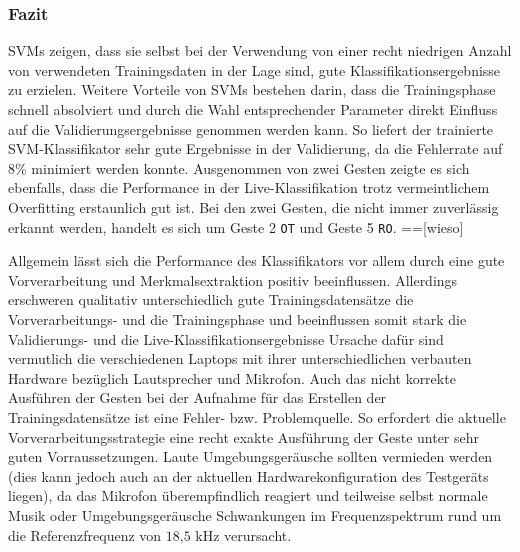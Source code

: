 \subsubsection{Fazit}\label{sec:svm_conclusion}
\ac{SVM}s zeigen, dass sie selbst bei der Verwendung von einer recht niedrigen Anzahl von verwendeten Trainingsdaten in der Lage sind, gute Klassifikationsergebnisse zu erzielen.
Weitere Vorteile von \ac{SVM}s bestehen darin, dass die Trainingsphase schnell absolviert und durch die Wahl entsprechender Parameter direkt Einfluss auf die Validierungsergebnisse genommen werden kann.
So liefert der trainierte \ac{SVM}-Klassifikator sehr gute Ergebnisse in der Validierung, da die Fehlerrate auf 8\% minimiert werden konnte.
Ausgenommen von zwei Gesten zeigte es sich ebenfalls, dass die Performance in der Live-Klassifikation trotz vermeintlichem Overfitting erstaunlich gut ist.
Bei den zwei Gesten, die nicht immer zuverlässig erkannt werden, handelt es sich um Geste 2 \texttt{\ac{OT}} und Geste 5 \texttt{\ac{RO}}.
==[wieso]

Allgemein lässt sich die Performance des Klassifikators vor allem durch eine gute Vorverarbeitung und Merkmalsextraktion positiv beeinflussen.
Allerdings erschweren qualitativ unterschiedlich gute Trainingsdatensätze die Vorverarbeitungs- und die Trainingsphase und beeinflussen somit stark die Validierungs- und die Live-Klassifikationsergebnisse
Ursache dafür sind vermutlich die verschiedenen Laptops mit ihrer unterschiedlichen verbauten Hardware bezüglich Lautsprecher und Mikrofon.
Auch das nicht korrekte Ausführen der Gesten bei der Aufnahme für das Erstellen der Trainingsdatensätze ist eine Fehler- bzw. Problemquelle.
So erfordert die aktuelle Vorverarbeitungsstrategie eine recht exakte Ausführung der Geste unter sehr guten Vorraussetzungen.
Laute Umgebungsgeräusche sollten vermieden werden (dies kann jedoch auch an der aktuellen Hardwarekonfiguration des Testgeräts liegen), da das Mikrofon überempfindlich reagiert und teilweise selbst normale Musik oder Umgebungsgeräusche Schwankungen im Frequenzspektrum rund um die Referenzfrequenz von $18\text{,}5\text{ kHz}$ verursacht.
